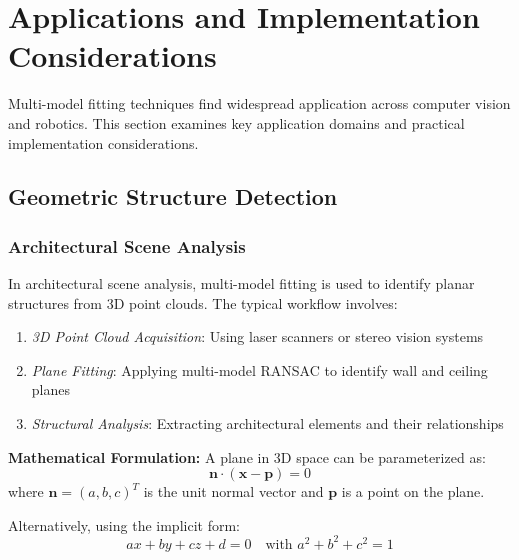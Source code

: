 \documentclass[12pt]{article}
\renewcommand{\vec}[1]{\mathbf{#1}}
\begin{document}
\newpage

\section{Applications and Implementation Considerations}
\label{sec:applications}

Multi-model fitting techniques find widespread application across computer vision and robotics. This section examines key application domains and practical implementation considerations.

\subsection{Geometric Structure Detection}
\label{subsec:geometric_applications}

\subsubsection{Architectural Scene Analysis}
\label{subsubsec:architectural_scenes}

In architectural scene analysis, multi-model fitting is used to identify planar structures from 3D point clouds. The typical workflow involves:

\begin{enumerate}
    \item \textit{3D Point Cloud Acquisition}: Using laser scanners or stereo vision systems
    \item \textit{Plane Fitting}: Applying multi-model RANSAC to identify wall and ceiling planes
    \item \textit{Structural Analysis}: Extracting architectural elements and their relationships
\end{enumerate}

\textbf{Mathematical Formulation:} A plane in 3D space can be parameterized as:
\begin{equation}
    \vec{n} \cdot (\vec{x} - \vec{p}) = 0
    \label{eq:plane_equation}
\end{equation}
where $\vec{n} = (a, b, c)^T$ is the unit normal vector and $\vec{p}$ is a point on the plane.

Alternatively, using the implicit form:
\begin{equation}
    ax + by + cz + d = 0 \quad \text{with } a^2 + b^2 + c^2 = 1
    \label{eq:plane_implicit}
\end{equation}
\end{document}
